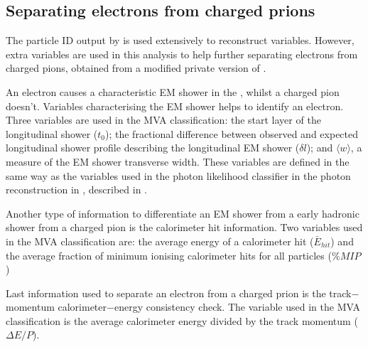 \subsection{Separating electrons from charged prions}

The particle ID output by \pandora is used extensively to reconstruct variables. However, extra variables are used in this analysis to help further separating  electrons from charged pions, obtained from a modified private version of \pandora.



An electron causes a characteristic EM shower in the \ECAL, whilst a charged pion doesn't. Variables characterising the  EM shower helps to identify an electron. Three variables are used in the MVA classification: the start layer of the longitudinal shower ($t_0$); the fractional difference between observed and expected longitudinal shower profile describing the longitudinal EM shower ($\delta{l}$); and $\langle{w}\rangle$, a measure of the EM shower transverse width. These variables are defined in the same way as the variables used in the photon likelihood classifier in the photon reconstruction in \pandora, described in .

Another type of information to differentiate an EM shower from a early hadronic shower from a charged pion is the calorimeter hit information. Two variables used in the MVA classification are: the average energy of a calorimeter hit ($\bar{E}_{hit}$) and the average fraction of minimum ionising calorimeter hits for all particles ($\%MIP$)

Last information used to separate an electron  from a charged prion is the track$-$momentum calorimeter$-$energy consistency check. The variable used in the MVA classification is the average calorimeter energy divided by the track momentum ($\Delta E/P$).








